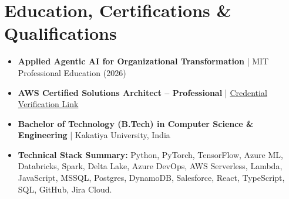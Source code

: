 \documentclass[9pt, letterpaper]{extarticle}
\begin{document}
\section{Education, Certifications \& Qualifications}
\begin{itemize}
    \item \textbf{Applied Agentic AI for Organizational Transformation} | MIT Professional Education (2026)
    \item \textbf{AWS Certified Solutions Architect -- Professional} | \href{https://www.credly.com/badges/7ef67d8d-67f2-4036-a8bf-8bbe73098a1f/linked_in?t=teze8g}{Credential Verification Link}
    \item \textbf{Bachelor of Technology (B.Tech) in Computer Science \& Engineering} | Kakatiya University, India
    \item \textbf{Technical Stack Summary:} Python, PyTorch, TensorFlow, Azure ML, Databricks, Spark, Delta Lake, Azure DevOps, AWS Serverless, Lambda, JavaScript, MSSQL, Postgres, DynamoDB, Salesforce, React, TypeScript, SQL, GitHub, Jira Cloud.
\end{itemize}
\end{document}

